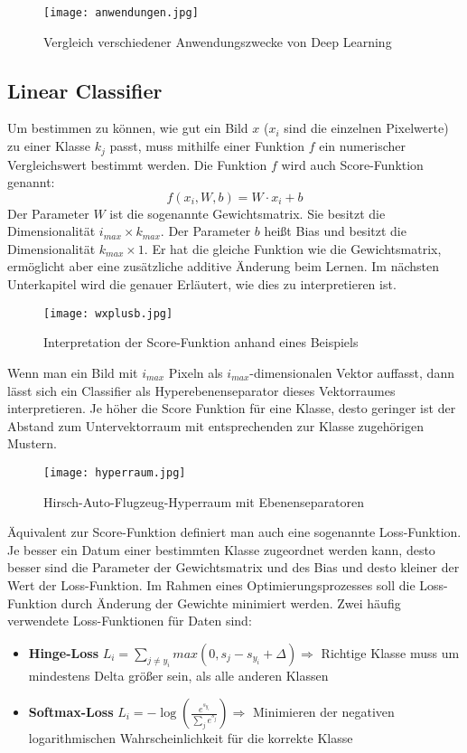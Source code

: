 \documentclass[11pt,ceqn]{book}
\begin{document}
\clearpage



\begin{figure}[h]
\centering
\vfill
\texttt{[image: anwendungen.jpg]}
\caption{Vergleich verschiedener Anwendungszwecke von Deep Learning}
\vfill
\end{figure}
\clearpage 


\subsection{Linear Classifier}
Um bestimmen zu können, wie gut ein Bild $x$ ($x_i$ sind die einzelnen Pixelwerte) zu einer Klasse $k_j$ passt, muss mithilfe einer Funktion $f$ ein numerischer Vergleichswert bestimmt werden. Die Funktion $f$ wird auch Score-Funktion genannt:
$$f(x_i, W, b) = W \cdot x_i + b$$
Der Parameter $W$ ist die sogenannte Gewichtsmatrix. Sie besitzt die Dimensionalität $i_{max} \times k_{max}$.
Der Parameter $b$ heißt Bias und besitzt die Dimensionalität $k_{max} \times 1$. Er hat die gleiche Funktion wie die Gewichtsmatrix, ermöglicht aber eine zusätzliche additive Änderung beim Lernen. Im nächsten Unterkapitel wird die genauer Erläutert, wie dies zu interpretieren ist.

\begin{figure}[H]
\centering
\texttt{[image: wxplusb.jpg]}
\caption{Interpretation der Score-Funktion anhand eines Beispiels}
\end{figure}

Wenn man ein Bild mit $i_{max}$ Pixeln als $i_{max}$-dimensionalen Vektor auffasst, dann lässt sich ein Classifier als Hyperebenenseparator dieses Vektorraumes interpretieren. Je höher die Score Funktion für eine Klasse, desto geringer ist der Abstand zum Untervektorraum mit entsprechenden zur Klasse zugehörigen Mustern.

\begin{figure}[H]
\centering
\texttt{[image: hyperraum.jpg]}
\caption{Hirsch-Auto-Flugzeug-Hyperraum mit Ebenenseparatoren}
\end{figure}

Äquivalent zur Score-Funktion definiert man auch eine sogenannte Loss-Funktion. Je besser ein Datum einer bestimmten Klasse zugeordnet werden kann, desto besser sind die Parameter der Gewichtsmatrix und des Bias und desto kleiner der Wert der Loss-Funktion. Im Rahmen eines Optimierungsprozesses soll die Loss-Funktion durch Änderung der Gewichte minimiert werden.
\bigskip
Zwei häufig verwendete Loss-Funktionen für Daten sind:
\begin{itemize}
\item \textbf{Hinge-Loss} $L_i = \sum\limits_{j \neq y_i} max\left(0,s_j - s_{y_i} + \Delta\right) \Rightarrow$ Richtige Klasse muss um mindestens Delta größer sein, als alle anderen Klassen
\item \textbf{Softmax-Loss} $L_i = -\log\left(\frac{e^{s_{y_i}}}{\sum_{j} e^{s_j}}\right) \Rightarrow$ Minimieren der negativen logarithmischen Wahrscheinlichkeit für die korrekte Klasse
\end{itemize}
\end{document}
